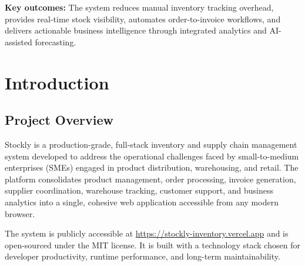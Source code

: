 ﻿\documentclass[12pt,a4paper]{report}
\begin{document}
\textbf{Key outcomes:} The system reduces manual inventory tracking overhead, provides real-time stock visibility, automates order-to-invoice workflows, and delivers actionable business intelligence through integrated analytics and AI-assisted forecasting.

\newpage

\tableofcontents
\newpage

\chapter{Introduction}

\section{Project Overview}

Stockly is a production-grade, full-stack inventory and supply chain management system developed to address the operational challenges faced by small-to-medium enterprises (SMEs) engaged in product distribution, warehousing, and retail. The platform consolidates product management, order processing, invoice generation, supplier coordination, warehouse tracking, customer support, and business analytics into a single, cohesive web application accessible from any modern browser.

The system is publicly accessible at \url{https://stockly-inventory.vercel.app} and is open-sourced under the MIT license. It is built with a technology stack chosen for developer productivity, runtime performance, and long-term maintainability.
\end{document}
